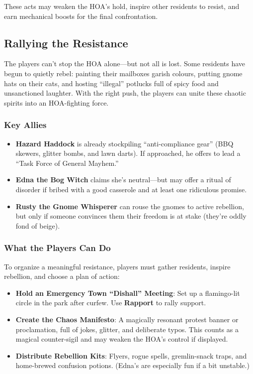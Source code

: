 \begin{multicols}{2}
These acts may weaken the HOA’s hold, inspire other residents to resist, and earn mechanical boosts for the final confrontation.


\subsection{Rallying the Resistance}

The players can’t stop the HOA alone—but not all is lost. Some residents have begun to quietly rebel: painting their mailboxes garish colours, putting gnome hats on their cats, and hosting “illegal” potlucks full of spicy food and unsanctioned laughter. With the right push, the players can unite these chaotic spirits into an HOA-fighting force.

\subsubsection*{Key Allies}
\begin{itemize}
    \item \textbf{Hazard Haddock} is already stockpiling “anti-compliance gear” (BBQ skewers, glitter bombs, and lawn darts). If approached, he offers to lead a “Task Force of General Mayhem.”
    \item \textbf{Edna the Bog Witch} claims she’s neutral—but may offer a ritual of disorder if bribed with a good casserole and at least one ridiculous promise.
    \item \textbf{Rusty the Gnome Whisperer} can rouse the gnomes to active rebellion, but only if someone convinces them their freedom is at stake (they’re oddly fond of beige).
\end{itemize}

\subsubsection*{What the Players Can Do}
To organize a meaningful resistance, players must gather residents, inspire rebellion, and choose a plan of action:

\begin{itemize}
    \item \textbf{Hold an Emergency Town “Dishall” Meeting}: Set up a flamingo-lit circle in the park after curfew. Use \textbf{Rapport}  to rally support.
    \item \textbf{Create the Chaos Manifesto}: A magically resonant protest banner or proclamation, full of jokes, glitter, and deliberate typos. This counts as a magical counter-sigil and may weaken the HOA’s control if displayed.
    \item \textbf{Distribute Rebellion Kits}: Flyers, rogue spells, gremlin-snack traps, and home-brewed confusion potions. (Edna’s are especially fun if a bit unstable.)
\end{itemize}


\end{multicols}
